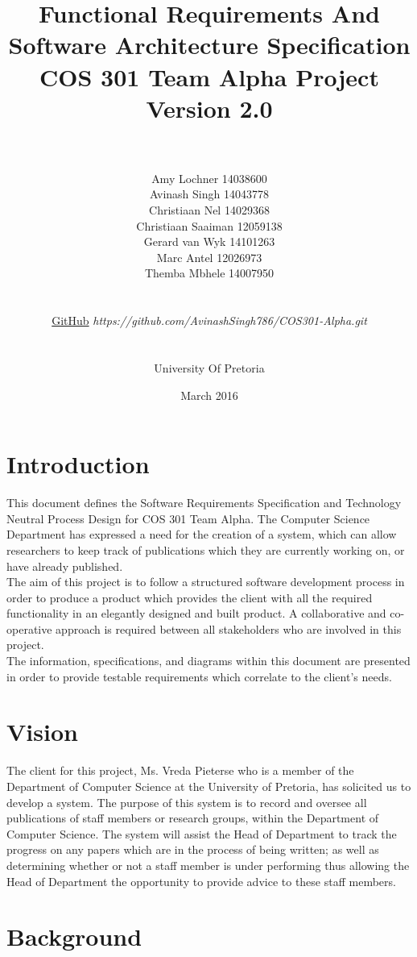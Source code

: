 \documentclass[a4paper]{article}
\title{\huge Functional Requirements And Software Architecture Specification
	\\COS 301 Team Alpha Project
	\\Version 2.0}
\author{\\\\Amy Lochner 14038600\\ Avinash Singh 14043778 \\
	Christiaan Nel 14029368\\ Christiaan Saaiman 12059138 \\
	Gerard van Wyk 14101263\\ Marc Antel 12026973\\
	Themba Mbhele 14007950
	\\
	\\
	\\\href{https://github.com/AvinashSingh786/COS301-Alpha.git}{GitHub}
	\textit{https://github.com/AvinashSingh786/COS301-Alpha.git}
	\\
	\\
	\\ University Of Pretoria\\}
\date{March 2016}
\begin{document}
	
	\maketitle

	\newpage

	\tableofcontents
	\newpage
	
\section{Introduction}
	
	This document defines the Software Requirements Specification and Technology Neutral Process Design for COS 301 Team Alpha. The Computer Science Department has expressed a need for the creation of a system, which can allow researchers to keep track of publications which they are currently working on, or have already published.
	\\
	The aim of this project is to follow a structured software development process in order to produce a product which provides the client with all the required functionality in an elegantly designed and built product. A collaborative and co-operative approach is required between all stakeholders who are involved in this project. 
	\\
	The information, specifications, and diagrams within this document are presented in order to provide testable requirements which correlate to the client's needs.
	
\section{Vision}
	The client for this project, Ms. Vreda Pieterse who is a member of the Department of Computer Science at the University of Pretoria, has solicited us to develop a system. The purpose of this system is to record and oversee all publications of staff members or research groups, within the Department of Computer Science. The system will assist the Head of Department to track the progress on any papers which are in the process of being written; as well as determining whether or not a staff member is under performing thus allowing the Head of Department the opportunity to provide advice to these staff members.
	
\section{Background}
\end{document}
